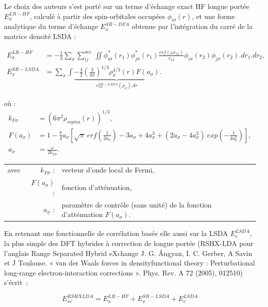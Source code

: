 Le choix des auteurs s'est porté sur un terme d'échange exact HF longue portée $E_{x}^{LR-HF}$, calculé à partir des spin-orbitales occupées $\phi_{i \sigma}(r)$, et une forme analytique du terme d'échange $E_{x}^{SR-DFA}$ obtenue par l'intégration du carré de la matrice densité LSDA :

\begin{align}
E_{x}^{LR-HF} &= -\frac{1}{2} \sum_{\sigma} \sum_{ij}^{occ.} \iint \phi_{i \sigma}^{*}(r_{1}) \phi_{j \sigma}^{*}(r_{1}) \frac{erf(\omega r_{12})}{r_{12}} \phi_{i \sigma}(r_{2}) \phi_{j \sigma}(r_{2}).dr_{1}.dr_{2}, \\
E_{x}^{SR-LSDA} &= \sum_{\sigma} \int \underbrace{-\frac{3}{2}\left(\frac{3}{4\pi}\right)^{1/3}\rho_{\sigma}^{4/3} (r) F(a_{\sigma})}_{e_{x \sigma}^{SR-LSDA} (\rho_{\sigma}) .dr}.
\end{align}

\noindent où :
\begin{align}
k_{F \sigma}&=(6\pi^{2}\rho_{sigma}(r))^{1/3},\nonumber\\
F(a_{\sigma})&=1-\frac{8}{3}a_{\sigma}\left[\sqrt{\pi}\: erf\left(\frac{1}{2a_{\sigma}}\right)-3a_{\sigma}+4a_{\sigma}^{3}+(2a_{\sigma}-4a_{\sigma}^{3}) \: exp\left(-\frac{1}{4a_{\sigma}^{2}}\right)\right],\nonumber\\
a_{\sigma}&=\frac{\omega}{2k_{F\sigma}}.\nonumber
\end{align}

\begin{flushleft}
\begin{tabular}{@{}lrp{10cm}}
avec & $k_{F\sigma}$ : & vecteur d'onde local de Fermi,\\
& $F(a_{\sigma})$ : & fonction d'atténuation,\\
& $a_{\sigma}$ : & paramètre de contrôle (sans unité) de la fonction d'atténuation $F(a_{\sigma})$.
\end{tabular}
\end{flushleft}

En retenant une fonctionnelle de corrélation basée elle aussi sur la LSDA $E_{c}^{LSDA}$, la plus simple des DFT hybrides à correction de longue portée (RSHX-LDA pour l’anglais Range Separated Hybrid eXchange J. G. Ángyan, I. C. Gerber, A Savin et J Toulouse. « van der Waals forces in densityfunctional theory : Perturbational long-range electron-interaction corrections ». Phys. Rev. A 72 (2005), 012510) s'écrit~:

\begin{equation}
E_{xc}^{RSHXLDA} = E_{x}^{LR-HF} + E_{x}^{SR-LSDA} + E_{c}^{LSDA}
\end{equation}

